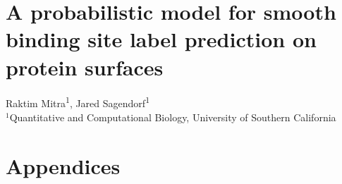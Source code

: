 \documentclass[letterpaper,11pt]{report}
\begin{document}

% 

\chapter{A probabilistic model for smooth binding site label prediction on protein surfaces}
\label{cha:research_topic_2}

\vspace*{0.35in}

\begin{flushleft}

{\large Raktim Mitra\textsuperscript{1}, 
Jared Sagendorf\textsuperscript{1}}\\

\bigskip
$^1$Quantitative and Computational Biology, University of Southern California
\\


\end{flushleft}











\begin{singlespace}


\end{singlespace}

{}%
%
\chapter*{Appendices}
\renewcommand\thesection{\Alph{section}}
\renewcommand*{\thesubsection}{\Alph{section}.\arabic{subsection}}
\begingroup
{}

\endgroup

\end{document}
